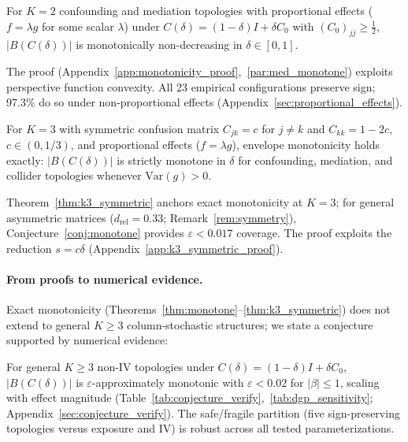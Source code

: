 \begin{theorem}[Envelope monotonicity, $K{=}2$]
\label{thm:monotone}
For $K{=}2$ confounding and mediation topologies with proportional effects ($f = \lambda g$ for some scalar $\lambda$) under $C(\delta) = (1{-}\delta)I + \delta C_0$ with $(C_0)_{jj} \geq \tfrac{1}{2}$, $|B(C(\delta))|$ is monotonically non-decreasing in $\delta \in [0,1]$.
\end{theorem}

The proof (Appendix~\ref{app:monotonicity_proof},~\ref{par:med_monotone}) exploits perspective function convexity. All 23 empirical configurations preserve sign; 97.3\% do so under non-proportional effects (Appendix~\ref{sec:proportional_effects}).

\begin{theorem}[$K{=}3$ symmetric monotonicity]
\label{thm:k3_symmetric}
For $K{=}3$ with symmetric confusion matrix $C_{jk} = c$ for $j \neq k$ and $C_{kk} = 1{-}2c$, $c \in (0, 1/3)$, and proportional effects ($f{=}\lambda g$), envelope monotonicity holds exactly: $|B(C(\delta))|$ is strictly monotone in $\delta$ for confounding, mediation, and collider topologies whenever $\mathrm{Var}(g) > 0$.
\end{theorem}

Theorem~\ref{thm:k3_symmetric} anchors exact monotonicity at $K{=}3$; for general asymmetric matrices ($d_{\mathrm{rel}}{=}0.33$; Remark~\ref{rem:symmetry}), Conjecture~\ref{conj:monotone} provides $\varepsilon < 0.017$ coverage. The proof exploits the reduction $s = c\delta$ (Appendix~\ref{app:k3_symmetric_proof}).

\paragraph{From proofs to numerical evidence.}
Exact monotonicity (Theorems~\ref{thm:monotone}--\ref{thm:k3_symmetric}) does not extend to general $K{\geq}3$ column-stochastic structures; we state a conjecture supported by numerical evidence:

\begin{conjecture}
\label{conj:monotone}
For general $K{\geq}3$ non-IV topologies under $C(\delta) = (1{-}\delta)I + \delta C_0$, $|B(C(\delta))|$ is $\varepsilon$-approximately monotonic with $\varepsilon < 0.02$ for $|\beta| \leq 1$, scaling with effect magnitude (Table~\ref{tab:conjecture_verify},~\ref{tab:dgp_sensitivity}; Appendix~\ref{sec:conjecture_verify}). The safe/fragile partition (five sign-preserving topologies versus exposure and IV) is robust across all tested parameterizations.
\end{conjecture}

